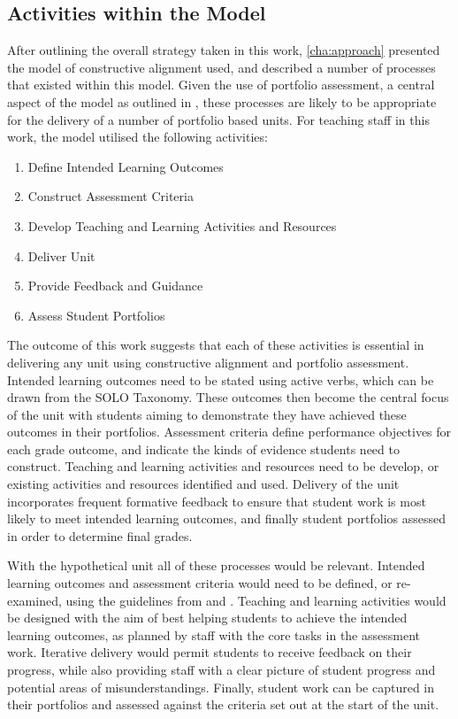 
\subsection{Activities within the Model} %
\label{sub:processes_within_the_model}

After outlining the overall strategy taken in this work, \cref{cha:approach} presented the model of constructive alignment used, and described a number of processes that existed within this model. Given the use of portfolio assessment, a central aspect of the model as outlined in , these processes are likely to be appropriate for the delivery of a number of portfolio based units. For teaching staff in this work, the model utilised the following activities:

\begin{enumerate}
	\item Define Intended Learning Outcomes
	\item Construct Assessment Criteria
	\item Develop Teaching and Learning Activities and Resources
	\item Deliver Unit
	\item Provide Feedback and Guidance
	\item Assess Student Portfolios
\end{enumerate}

The outcome of this work suggests that each of these activities is essential in delivering any unit using constructive alignment and portfolio assessment. Intended learning outcomes need to be stated using active verbs, which can be drawn from the SOLO Taxonomy. These outcomes then become the central focus of the unit with students aiming to demonstrate they have achieved these outcomes in their portfolios. Assessment criteria define performance objectives for each grade outcome, and indicate the kinds of evidence students need to construct. Teaching and learning activities and resources need to be develop, or existing activities and resources identified and used. Delivery of the unit incorporates frequent formative feedback to ensure that student work is most likely to meet intended learning outcomes, and finally student portfolios assessed in order to determine final grades. 

With the hypothetical unit all of these processes would be relevant. Intended learning outcomes and assessment criteria would need to be defined, or re-examined, using the guidelines from  and . Teaching and learning activities would be designed with the aim of best helping students to achieve the intended learning outcomes, as planned by staff with the core tasks in the assessment work. Iterative delivery would permit students to receive feedback on their progress, while also providing staff with a clear picture of student progress and potential areas of misunderstandings. Finally, student work can be captured in their portfolios and assessed against the criteria set out at the start of the unit.

